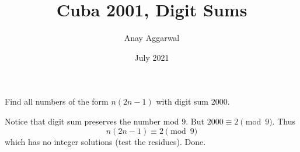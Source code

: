 \documentclass{article}
\title{Cuba 2001, Digit Sums}
\author{Anay Aggarwal}
\date{July 2021}
\begin{document}
\maketitle
\begin{example}
  [Cuba 2001]
  Find all numbers of the form $n(2n-1)$ with digit sum $2000$.
\end{example}
Notice that digit sum preserves the number mod $9$. But $2000\equiv 2\pmod{9}$.
Thus
$$n(2n-1)\equiv 2\pmod{9}$$
which has no integer solutions (test the residues). Done.
\end{document}
